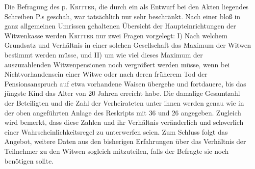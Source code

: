 Die Befragung des p. \textsc{Kritter}, die durch ein als Entwurf bei den Akten liegendes Schreiben P.s geschah, war tatsächlich nur sehr beschränkt. Nach einer bloß in ganz allgemeinen Umrissen gehaltenen Übersicht der Haupteinrichtungen der Witwenkasse werden \textsc{Kritter} nur zwei Fragen vorgelegt: I) Nach welchem Grundsatz und Verhältnis in einer solchen Gesellschaft das Maximum der Witwen bestimmt werden müsse, und II) um wie viel dieses Maximum der auszuzahlenden Witwenpensionen noch vergrößert werden müsse, wenn bei Nichtvorhandensein einer Witwe oder nach deren früherem Tod der Pensionsanspruch auf etwa vorhandene Waisen übergehe und fortdauere, bis das jüngste Kind das Alter von 20 Jahren erreicht habe. Die damalige Gesamtzahl der Beteiligten und die Zahl der Verheirateten unter ihnen werden genau wie in der oben angeführten Anlage des Reskripts mit 36 und 26 angegeben. Zugleich wird bemerkt, dass diese Zahlen und ihr Verhältnis veränderlich und schwerlich einer Wahrscheinlichkeitsregel zu unterwerfen seien. Zum Schluss folgt das Angebot, weitere Daten aus den bisherigen Erfahrungen über das Verhältnis der Teilnehmer zu den Witwen sogleich mitzuteilen, falls der Befragte sie noch benötigen sollte.

